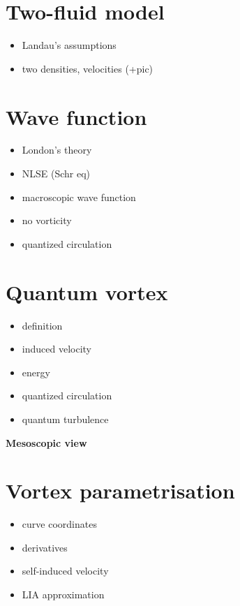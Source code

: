 \documentclass[a4paper, 12pt]{report}
\newcommand{\<}{\langle} %
\renewcommand{\>}{\rangle} %
\begin{document}
\section{Two-fluid model}
\begin{itemize}
	\item Landau's assumptions
	\item two densities, velocities (+pic)
\end{itemize}

\section{Wave function}
\begin{itemize}
	\item London's theory
	\item NLSE (Schr eq)
	\item macroscopic wave function
	\item no vorticity
	\item quantized circulation
\end{itemize}

\section{Quantum vortex}
\begin{itemize}
	\item definition
	\item induced velocity
	\item energy
	\item quantized circulation
	\item quantum turbulence
\end{itemize}

\newpage

{\Huge \bfseries Mesoscopic view}
\vspace{0.3cm}

\section{Vortex parametrisation}
\begin{itemize}
	\item curve coordinates
	\item derivatives
	\item self-induced velocity
	\item LIA approximation
\end{itemize}
\end{document}
